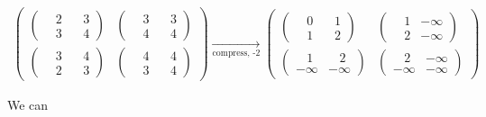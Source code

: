 \documentclass{article}
\newcommand{\<}{\langle}
\renewcommand{\>}{\rangle}
\theoremstyle{definition}\newtheorem{definition}{\textit{Definition}}
\begin{document}
\begin{align}
    \left(\begin{matrix}
        \left(\begin{matrix}
            ~~~~2 & ~~~~3\\
            ~~~~3 & ~~~~4
        \end{matrix}\right) &
        \left(\begin{matrix}
            ~~~~3 & ~~~~3\\
            ~~~~4 & ~~~~4
        \end{matrix}\right) \\
        \left(\begin{matrix}
            ~~~~3 & ~~~~4\\
            ~~~~2 & ~~~~3
        \end{matrix}\right) &
        \left(\begin{matrix}
            ~~~~4 & ~~~~4\\
            ~~~~3 & ~~~~4
        \end{matrix}\right)
    \end{matrix}\right)
    \xrightarrow[\text{compress, -2}]{}
    \left(\begin{matrix}
        \left(\begin{matrix}
            ~~~~0 & ~~~~1\\
            ~~~~1 & ~~~~2
        \end{matrix}\right) &
        \left(\begin{matrix}
            ~~~~1 & -\infty\\
            ~~~~2 & -\infty
        \end{matrix}\right) \\
        \left(\begin{matrix}
            ~~~~1 & ~~~~2\\
            -\infty & -\infty
        \end{matrix}\right) &
        \left(\begin{matrix}
            ~~~~2 & -\infty\\
            -\infty & -\infty
        \end{matrix}\right)
    \end{matrix}\right)
\end{align}

We can 
\end{document}
